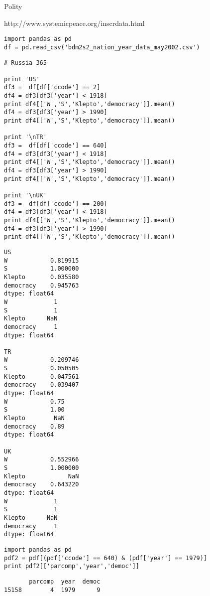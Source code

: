 \documentclass[12pt,fleqn]{article}\usepackage{common}
\begin{document}
Polity

http://www.systemicpeace.org/inscrdata.html

\begin{verbatim}
import pandas as pd
df = pd.read_csv('bdm2s2_nation_year_data_may2002.csv')
\end{verbatim}


\begin{verbatim}
# Russia 365

print 'US'
df3 =  df[df['ccode'] == 2]
df4 = df3[df3['year'] < 1918]
print df4[['W','S','Klepto','democracy']].mean()
df4 = df3[df3['year'] > 1990]
print df4[['W','S','Klepto','democracy']].mean()

print '\nTR'
df3 =  df[df['ccode'] == 640]
df4 = df3[df3['year'] < 1918]
print df4[['W','S','Klepto','democracy']].mean()
df4 = df3[df3['year'] > 1990]
print df4[['W','S','Klepto','democracy']].mean()

print '\nUK'
df3 =  df[df['ccode'] == 200]
df4 = df3[df3['year'] < 1918]
print df4[['W','S','Klepto','democracy']].mean()
df4 = df3[df3['year'] > 1990]
print df4[['W','S','Klepto','democracy']].mean()
\end{verbatim}

\begin{verbatim}
US
W            0.819915
S            1.000000
Klepto       0.035580
democracy    0.945763
dtype: float64
W             1
S             1
Klepto      NaN
democracy     1
dtype: float64

TR
W            0.209746
S            0.050505
Klepto      -0.047561
democracy    0.039407
dtype: float64
W            0.75
S            1.00
Klepto        NaN
democracy    0.89
dtype: float64

UK
W            0.552966
S            1.000000
Klepto            NaN
democracy    0.643220
dtype: float64
W             1
S             1
Klepto      NaN
democracy     1
dtype: float64
\end{verbatim}


\begin{verbatim}
import pandas as pd
pdf2 = pdf[(pdf['ccode'] == 640) & (pdf['year'] == 1979)]
print pdf2[['parcomp','year','democ']]
\end{verbatim}

\begin{verbatim}
       parcomp  year  democ
15158        4  1979      9
\end{verbatim}
\end{document}
